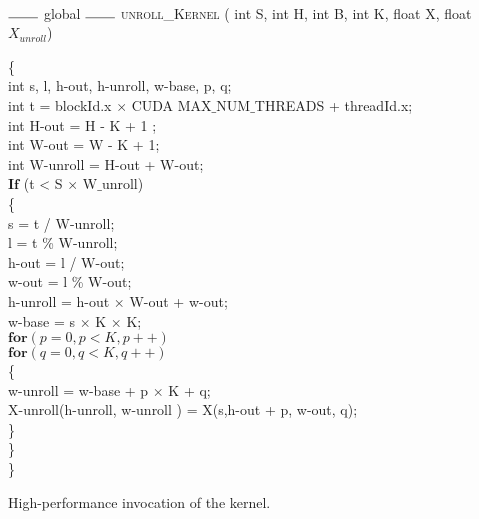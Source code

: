 \documentclass[7pt]{article}
\begin{document}
\
\begin{algorithm}
	\vspace{0.1in}
	{{$\rule{0.75cm}{.4pt}$ global $\rule{0.75cm}{.4pt} $} \textsc{unroll\_Kernel} ( int S, int H, int B, int K, float X, float $X_{unroll}$)}\\
	
	\vspace{0.05in}
	
	\{ \\
	int s, l, h-out, h-unroll, w-base, p, q; \\
	int t = blockId.x $\times$ CUDA MAX$\_$NUM$\_$THREADS + threadId.x; \\
	int H-out = H - K + 1 ;\\
	int W-out = W - K + 1; \\
	int W-unroll = H-out + W-out;\\
		\vspace{0.05in}
\hspace{0.1cm}	$\mathbf{If}${ (t < S $\times$  W$\_$unroll)} \\
\hspace{0.25cm}	\{\\
	\hspace{1.0cm}	s =  t / W-unroll; \\
	\hspace{1.0cm}		l = t \% W-unroll; \\
	\hspace{1.0cm}		h-out = l / W-out; \\
	\hspace{1.0cm}		w-out = l \% W-out; \\
	\hspace{1.0cm}		h-unroll = h-out $\times$ W-out + w-out;\\
	\hspace{1.0cm}		w-base = s $\times$ K $\times$ K; \\
	\hspace{1.5cm}		$\mathbf{for} (p=0,p<K,p++)$\\
		\hspace{1.75cm}		$\mathbf{for} (q=0,q<K,q++)$\\
\hspace{2.0cm}		\{ \\
\hspace{2.5cm}		w-unroll = w-base + p $\times$ K + q; \\
\hspace{2.5cm}		X-unroll(h-unroll, w-unroll ) = X(s,h-out + p, w-out, q);\\
\hspace{2.0cm}		\}  \\
\hspace{0.25cm}	\}\\
\}
	\caption{High-performance invocation of the kernel.}
\end{algorithm}
\end{document}
